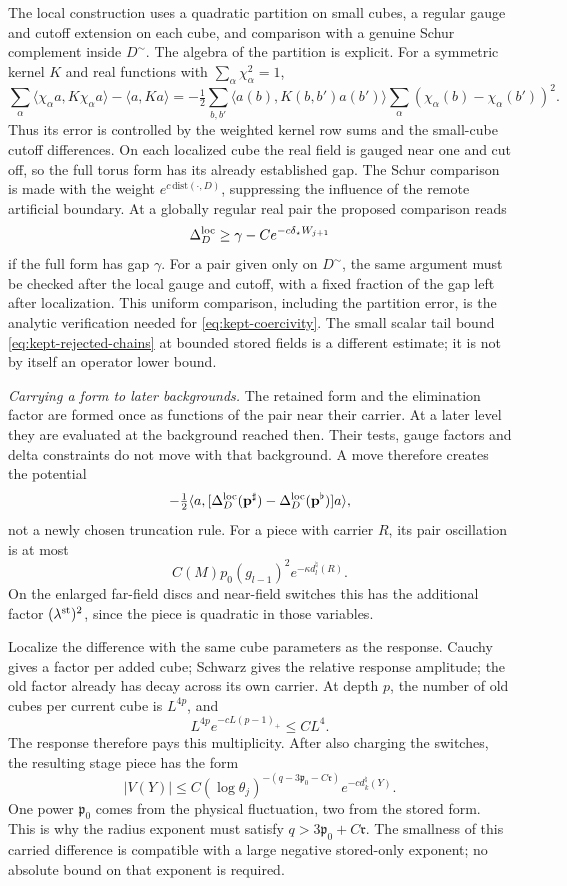 \documentclass[11pt,letterpaper,reqno]{amsart}
\theoremstyle{definition}
\theoremstyle{remark}
\begin{document}
The local construction uses a quadratic partition
on small cubes, a regular gauge and cutoff extension
on each cube, and comparison with a genuine Schur
complement inside \(D^\sim\). The algebra of the
partition is explicit. For a symmetric kernel \(K\)
and real functions with \(\sum_\alpha\chi_\alpha^2=1\),
\[
 \sum_\alpha\langle\chi_\alpha a,K\chi_\alpha a\rangle
        -\langle a,Ka\rangle
 =-\tfrac12\sum_{b,b'}\langle a(b),K(b,b')a(b')\rangle
                  \sum_\alpha(\chi_\alpha(b)-\chi_\alpha(b'))^2 .
\]
Thus its error is controlled by the weighted kernel
row sums and the small-cube cutoff differences.
On each localized cube the real field is gauged
near one and cut off, so the full torus form has
its already established gap.
The Schur comparison is made with the weight
\(e^{c\,\mathrm{dist}(\cdot,D)}\), suppressing
the influence of the remote artificial boundary.
At a globally regular real pair the proposed
comparison reads
\[
 \Delta_D^{\rm loc}\ge
               \gamma-Ce^{-c\delta_\star W_{j+1}}
\]
if the full form has gap \(\gamma\).
For a pair given only on \(D^\sim\), the same argument
must be checked after the local gauge and cutoff,
with a fixed fraction of the gap left after
localization. This uniform comparison, including
the partition error, is the analytic verification
needed for \eqref{eq:kept-coercivity}. The small
scalar tail bound \eqref{eq:kept-rejected-chains}
at bounded stored fields is a different estimate;
it is not by itself an operator lower bound.

\emph{Carrying a form to later backgrounds.}
The retained form and the elimination factor are
formed once as functions of the pair near their
carrier. At a later level they are evaluated at
the background reached then. Their tests, gauge
factors and delta constraints do not move with
that background. A move therefore creates the
potential
\[
 -\tfrac12\langle a,
       [\Delta_D^{\rm loc}(\mathbf p^\sharp)
                         -\Delta_D^{\rm loc}(\mathbf p^\flat)]a\rangle ,
\]
not a newly chosen truncation rule. For a piece
with carrier \(R\), its pair oscillation is at
most
\[
 C(M)p_0(g_{l-1})^2e^{-\kappa d_l^\natural(R)}.
\]
On the enlarged far-field discs and near-field
switches this has the additional factor
\((\lambda^{\rm st})^2\), since the piece is
quadratic in those variables.

Localize the difference with the same cube parameters
as the response. Cauchy gives a factor per added cube;
Schwarz gives the relative response amplitude; the
old factor already has decay across its own carrier.
At depth \(p\), the number of old cubes per current
cube is \(L^{4p}\), and
\[
 L^{4p}e^{-cL(p-1)_+}\le CL^4.
\]
The response therefore pays this multiplicity.
After also charging the switches, the resulting
stage piece has the form
\[
 |V(Y)|\le
 C(\log\theta_j)^{-(q-3\mathfrak p_0-C\mathfrak r)}
                                      e^{-c d_k^\natural(Y)}.
\]
One power \(\mathfrak p_0\) comes from the
physical fluctuation, two from the stored form.
This is why the radius exponent must satisfy
\(q>3\mathfrak p_0+C\mathfrak r\).
The smallness of this carried difference is
compatible with a large negative stored-only
exponent; no absolute bound on that exponent
is required.
\end{document}
